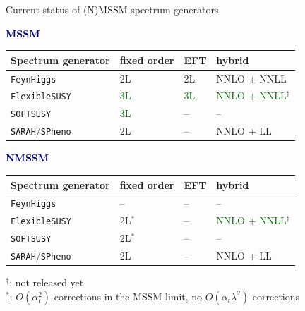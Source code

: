 \documentclass[hyperref={pdfpagelabels=false},ngerman]{beamer}
\renewcommand{\emph}[1]{\textbf{\textcolor{darkblue}{#1}}}
\newcommand{\FS}{\texttt{FlexibleSUSY}\xspace}
\newcommand{\FH}{\texttt{FeynHiggs}\xspace}
\newcommand{\SPheno}{\texttt{SPheno}\xspace}
\newcommand{\SARAH}{\texttt{SARAH}\xspace}
\newcommand{\SOFTSUSY}{\texttt{SOFTSUSY}\xspace}
\newcommand{\at}{\alpha_t}
\begin{document}
\begin{frame}[noframenumbering]{Current status of (N)MSSM spectrum generators}
  \begin{center}
    \emph{MSSM}\\[0.4em]
    \begin{tabular}{llll}
      \toprule
      Spectrum generator & fixed order & EFT & hybrid \\
      \midrule
      \FH                & 2L & 2L & NNLO + NNLL \\
      \FS                & \textcolor{darkgreen}{3L} & \textcolor{darkgreen}{3L} & \textcolor{darkgreen}{NNLO + NNLL}$^\dagger$ \\
      \SOFTSUSY          & \textcolor{darkgreen}{3L} & -- & -- \\
      \SARAH/\SPheno     & 2L & -- & NNLO + LL \\
      \bottomrule
    \end{tabular}
  \end{center}
  \begin{center}
    \emph{NMSSM}\\[0.4em]
    \begin{tabular}{llll}
      \toprule
      Spectrum generator & fixed order & EFT & hybrid \\
      \midrule
      \FH                & -- & -- & -- \\
      \FS                & 2L$^*$ & -- & \textcolor{darkgreen}{NNLO + NNLL}$^\dagger$ \\
      \SOFTSUSY          & 2L$^*$ & -- & -- \\
      \SARAH/\SPheno     & 2L & -- & NNLO + LL \\
      \bottomrule
    \end{tabular}
  \end{center}
  $^\dagger$: not released yet\\
  $^*$: $O(\at^2)$ corrections in the MSSM limit, no $O(\at\lambda^2)$ corrections
\end{frame}

\end{document}

